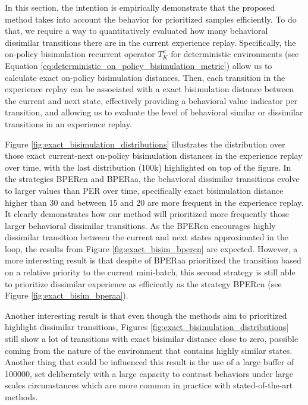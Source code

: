 In this section, the intention is empirically demonstrate that the proposed method takes into account the behavior for prioritized samples efficiently. To do that, we require a way to quantitatively evaluated how many behavioral dissimilar transitions there are in the current experience replay. Specifically, the on-policy bisimulation recurrent operator $T_K^\pi$ for deterministic environments (see Equation \ref{eq:deterministic_on_policy_bisimulation_metric}) allow us to calculate exact on-policy bisimulation distances. Then, each transition in the experience replay can be associated with a exact bisimulation distance between the current and next state, effectively providing a behavioral value indicator per transition, and allowing us to evaluate the level of behavioral similar or dissimilar transitions in an experience replay. 

Figure \ref{fig:exact_bisimulation_distributions} illustrates the distribution over those exact current-next on-policy bisimulation distances in the experience replay over time, with the last distribution (100k) highlighted on top of the figure. In the strategies BPERcn and BPERaa, the behavioral dissimilar transitions evolve to larger values than PER over time, specifically exact bisimulation distance higher than 30 and between 15 and 20 are more frequent in the experience replay. It clearly demonstrates how our method will prioritized more frequently those larger behavioral dissimilar transitions. As the BPERcn encourages highly dissimilar transition between the current and next states approximated in the loop, the results from Figure \ref{fig:exact_bisim_bpercn} are expected. However, a more interesting result is that despite of BPERaa prioritized the transition based on a relative priority to the current mini-batch, this second strategy is still able to prioritize dissimilar experience as efficiently as the strategy BPERcn (see Figure \ref{fig:exact_bisim_bperaa}).

Another interesting result is that even though the methods aim to prioritized highlight dissimilar transitions, Figures \ref{fig:exact_bisimulation_distributions} still show a lot of transitions with exact bisimilar distance close to zero, possible coming from the nature of the environment that contains highly similar states. Another thing that could be influenced this result is the use of a large buffer of 100000, set deliberately with a large capacity to contrast behaviors under large scales circumstances which are more common in practice with stated-of-the-art methods.

